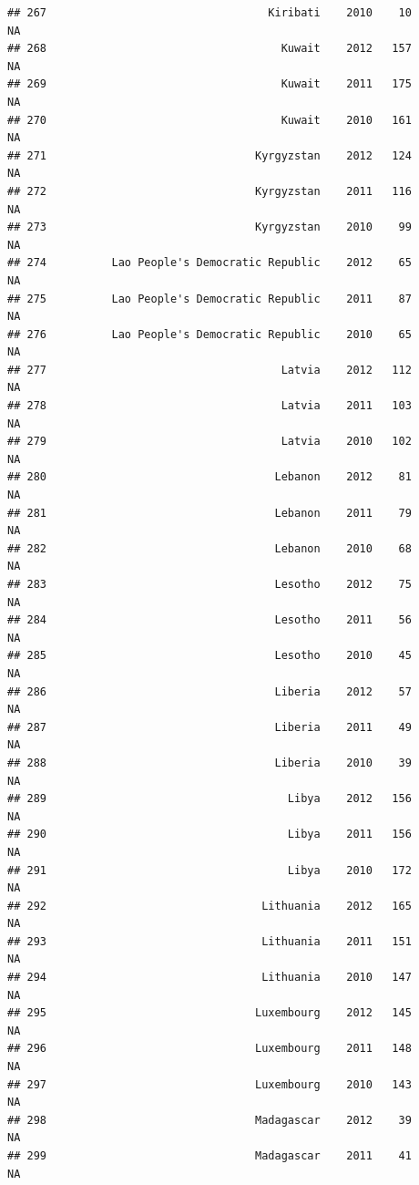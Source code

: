 \documentclass[
]{book}
\begin{document}
\begin{verbatim}
## 267                                  Kiribati    2010    10              NA
## 268                                    Kuwait    2012   157              NA
## 269                                    Kuwait    2011   175              NA
## 270                                    Kuwait    2010   161              NA
## 271                                Kyrgyzstan    2012   124              NA
## 272                                Kyrgyzstan    2011   116              NA
## 273                                Kyrgyzstan    2010    99              NA
## 274          Lao People's Democratic Republic    2012    65              NA
## 275          Lao People's Democratic Republic    2011    87              NA
## 276          Lao People's Democratic Republic    2010    65              NA
## 277                                    Latvia    2012   112              NA
## 278                                    Latvia    2011   103              NA
## 279                                    Latvia    2010   102              NA
## 280                                   Lebanon    2012    81              NA
## 281                                   Lebanon    2011    79              NA
## 282                                   Lebanon    2010    68              NA
## 283                                   Lesotho    2012    75              NA
## 284                                   Lesotho    2011    56              NA
## 285                                   Lesotho    2010    45              NA
## 286                                   Liberia    2012    57              NA
## 287                                   Liberia    2011    49              NA
## 288                                   Liberia    2010    39              NA
## 289                                     Libya    2012   156              NA
## 290                                     Libya    2011   156              NA
## 291                                     Libya    2010   172              NA
## 292                                 Lithuania    2012   165              NA
## 293                                 Lithuania    2011   151              NA
## 294                                 Lithuania    2010   147              NA
## 295                                Luxembourg    2012   145              NA
## 296                                Luxembourg    2011   148              NA
## 297                                Luxembourg    2010   143              NA
## 298                                Madagascar    2012    39              NA
## 299                                Madagascar    2011    41              NA

\end{verbatim}
\end{document}
